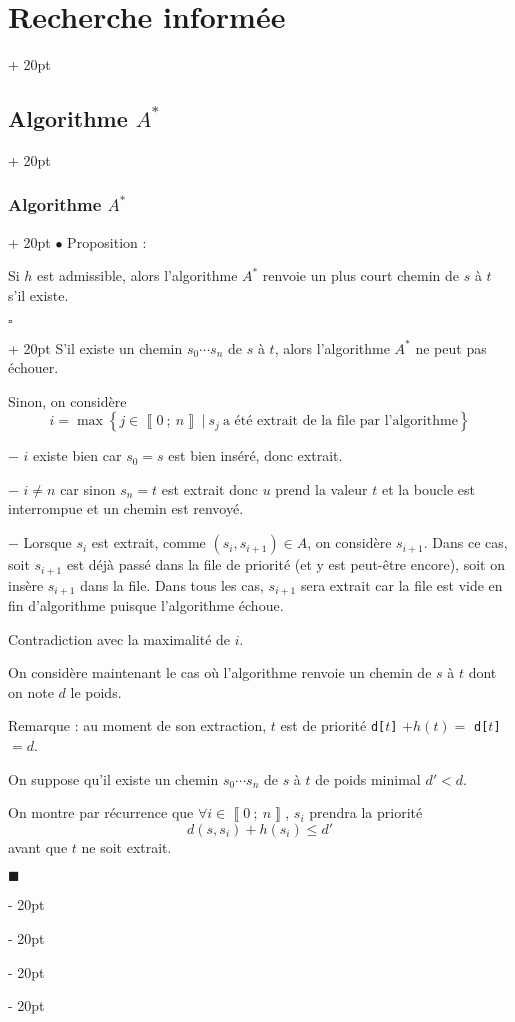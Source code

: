\documentclass[a4paper, 12pt, twoside]{article}
\newcommand{\nset}[2]{\left\llbracket #1\ ;\ #2 \right\rrbracket}
\newcommand{\set}[1]{\left\{ #1 \right\}}
\renewcommand{\le}{\leqslant}
\newcommand{\ind}[1][20pt]{\advance\leftskip + #1}
\newcommand{\deind}[1][20pt]{\advance\leftskip - #1}
\newenvironment{indt}[2][20pt]{#2 \par \ind[#1]}{\par \deind} %
\newenvironment{proof}[1][{}]{\begin{indt}{$\square$ #1}}{$\blacksquare$ \end{indt}}
\begin{document}
\begin{indt}{\section{Recherche informée}}
\begin{indt}{\subsection{Algorithme $A^*$}}
\begin{indt}{\subsubsection{Algorithme $A^*$}}
                $\bullet$ Proposition :
                \begin{emphBox}
                    Si $h$ est admissible, alors l'algorithme $A^*$ renvoie un plus court chemin de $s$ à $t$ s'il existe.
                \end{emphBox}

                \vspace{6pt}
                
                \begin{proof}
                    S'il existe un chemin $s_0 \cdots s_n$ de $s$ à $t$, alors l'algorithme $A^*$ ne peut pas échouer.

                    Sinon, on considère
                    \[
                        i = \max\!\set{j \in \nset 0 n\ |\ s_j\ \text{a été extrait de la file par l'algorithme}}
                \]

                    $-$ $i$ existe bien car $s_0 = s$ est bien inséré, donc extrait.

                    $-$ $i \neq n$ car sinon $s_n = t$ est extrait donc $u$ prend la valeur $t$ et la boucle est interrompue et un chemin est renvoyé.

                    $-$ Lorsque $s_i$ est extrait, comme $(s_i, s_{i + 1}) \in A$, on considère $s_{i + 1}$. Dans ce cas, soit $s_{i + 1}$ est déjà passé dans la file de priorité (et y est peut-être encore), soit on insère $s_{i + 1}$ dans la file. Dans tous les cas, $s_{i + 1}$ sera extrait car la file est vide en fin d'algorithme puisque l'algorithme échoue.

                    Contradiction avec la maximalité de $i$.

                    \vspace{6pt}
                    
                    On considère maintenant le cas où l'algorithme renvoie un chemin de $s$ à $t$ dont on note $d$ le poids.

                    Remarque : au moment de son extraction, $t$ est de priorité \texttt{d[$t$]} $+ h(t) =$ \texttt{d[$t$]} $= d$.

                    On suppose qu'il existe un chemin $s_0 \cdots s_n$ de $s$ à $t$ de poids minimal $d' < d$.

                    On montre par récurrence que $\forall i \in \nset 0 n$, $s_i$ prendra la priorité
                    \[
                        d(s, s_i) + h(s_i) \le d'
                    \]
                    avant que $t$ ne soit extrait.


\end{proof}
\end{indt}
\end{indt}
\end{indt}
\end{document}
